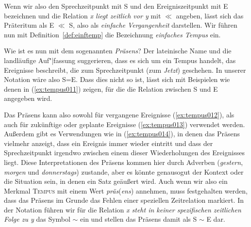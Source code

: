 
Wenn wir also den Sprechzeitpunkt mit S und den Ereigniszeitpunkt mit E bezeichnen und die Relation \textit{x liegt zeitlich vor y} mit $\ll$ angeben, lässt sich das Präteritum als E $\ll$ S, also als \textit{einfache Vergangenheit} darstellen.
Wir führen nun mit Definition~\ref{def:einftemp} die Bezeichnung \textit{einfaches Tempus} ein.


Wie ist es nun mit dem sogenannten \textit{Präsens}?
Der lateinische Name und die landläufige Auf"|fassung suggerieren, dass es sich um ein Tempus handelt, das Ereignisse beschreibt, die zum Sprechzeitpunkt (zum \textit{Jetzt}) geschehen.
In unserer Notation wäre also S=E.
Dass dies nicht so ist, lässt sich mit Beispielen wie denen in (\ref{ex:tempus011}) zeigen, für die die Relation zwischen S und E angegeben wird.

\begin{exe}
  \ex\label{ex:tempus011}
  \begin{xlist}
  \end{xlist}
\end{exe}


Das Präsens kann also sowohl für vergangene Ereignisse (\ref{ex:tempus012}), als auch für zukünftige oder geplante Ereignisse (\ref{ex:tempus013}) verwendet werden.
Außerdem gibt es Verwendungen wie in (\ref{ex:tempus014}), in denen das Präsens vielmehr anzeigt, dass ein Ereignis immer wieder eintritt und dass der Sprechzeitpunkt irgendwo zwischen einem dieser Wiederholungen des Ereignisses liegt.
Diese Interpretationen des Präsens kommen hier durch Adverben (\textit{gestern}, \textit{morgen} und \textit{donnerstags}) zustande, aber es könnte genausogut der Kontext oder die Situation sein, in denen ein Satz geäußert wird.
Auch wenn wir also ein Merkmal \textsc{Tempus} mit einem Wert \textit{präs}(\textit{ens}) annehmen, muss festgehalten werden, dass das Präsens im Grunde das Fehlen einer speziellen Zeitrelation markiert.
In der Notation führen wir für die Relation \textit{x steht in keiner spezifischen zeitlichen Folge zu y} das Symbol $\sim$ ein und stellen das Präsens damit als S $\sim$ E dar.

